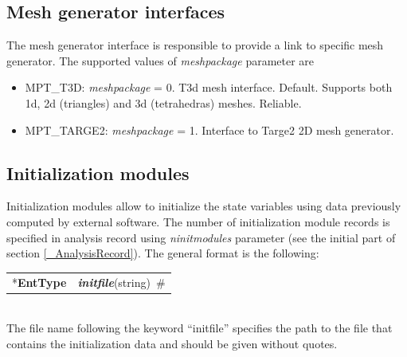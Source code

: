 \documentclass[a4paper]{article}
\makeatletter
\newcommand{\param}[1]{{\em #1}}
\newcommand{\keywordnotype}[1]{\mbox{{\it{\bf{#1}}}}}
\newcommand{\keyword}[2]{\mbox{{\keywordnotype{#1}\tiny (#2)}}}
\newcommand{\entKeyword}[1]{\mbox{{*{\bf{#1}}}}}
\newcommand{\field}[2]{\mbox{\keyword{#1}{#2}~\#}}
\newenvironment{record}[1][]{\begin{tabular}{|ll}}{\end{tabular}\\}
\newcommand{\recentry}[2]{{#1}&{#2}\\}
\newcounter{rcc}
\newenvironment{record}[1][\textwidth]{\setcounter{rcc}{0}\begin{tabular*}{#1}{|ll@{\extracolsep{\fill}}r}}{\end{tabular*}\\}
\newcommand{\recentry}[2]{\ifthenelse{\value{rcc}>0}{&$\backslash$ \\}{\setcounter{rcc}{1}}{#1}&{#2}}
\makeatother
\begin{document}
\subsection{Mesh generator interfaces}
\label{meshpackages}
The mesh generator interface is responsible to provide a link to
specific mesh generator. The supported values of \param{meshpackage}
parameter are
\begin{itemize}
\item
MPT\_T3D:  \param{meshpackage} = 0. T3d mesh interface. Default. Supports both 1d, 2d
(triangles) and 3d (tetrahedras) meshes. Reliable.
\item
MPT\_TARGE2:	\param{meshpackage} = 1. Interface to Targe2 2D
mesh generator.
\end{itemize}
%
\subsection{Initialization modules}
\label{InitModulesSec}
Initialization modules allow to initialize the state variables using data 
previously computed by external software. The number of initialization module records is specified in
analysis record using \param{ninitmodules} parameter (see the initial part of section \ref{_AnalysisRecord}). The general format
is the following:\\
\begin{record}
\recentry{\entKeyword{EntType}}
{\field{initfile}{string}}
\end{record}
The file name following the keyword ``initfile'' specifies
the path to the file that contains the initialization data
and should be given without quotes.
\end{document}
